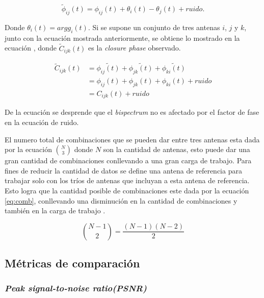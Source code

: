 \begin{equation}
\label{eq:phase}
    \tilde{\phi}_{ij}(t) = \phi_{ij}(t) + \theta_{i}(t) - \theta_{j}(t) + ruido.
\end{equation}

Donde $\theta_{i}(t) = arg g_{i}(t)$. Si se supone un conjunto de tres antenas $i$, $j$ y $k$, junto con la ecuación  mostrada anteriormente, se obtiene lo mostrado en la ecuación , donde $\tilde{C}_{ijk}(t)$ es la \textit{closure phase} observado. 

\begin{equation} \label{eq:noGain}
\begin{split}
\tilde{C}_{ijk}(t) & = \tilde{\phi_{ij}(t)} + \tilde{\phi_{jk}(t)} + \tilde{\phi_{ki}(t)}\\
 & = \phi_{ij}(t) + \phi_{jk}(t) + \phi_{ki}(t) + ruido \\
 & = C_{ijk}(t) + ruido
\end{split}
\end{equation}

De la ecuación  se desprende que el \textit{bispectrum} no es afectado por el factor de fase en la ecuación de ruido.

El numero total de combinaciones que se pueden dar entre tres antenas esta dada por la ecuación $\binom{N}{3}$ donde $N$ son la cantidad de antenas, esto puede dar una gran cantidad de combinaciones conllevando a una gran carga de trabajo. Para fines de reducir la cantidad de datos se define una antena de referencia para trabajar solo con los tríos de antenas que incluyan a esta antena de referencia. Esto logra que la cantidad posible de combinaciones este dada por la ecuación \ref{eq:comb}, conllevando una disminución en la cantidad de combinaciones y también en la carga de trabajo \citep{Chael_2018}. 

\begin{equation}
\label{eq:comb}
    \binom{N-1}{2} = \frac{(N - 1)(N - 2)}{2}
\end{equation}


\subsection{Métricas de comparación}

\subsubsection{\textit{Peak signal-to-noise ratio(PSNR)}}

